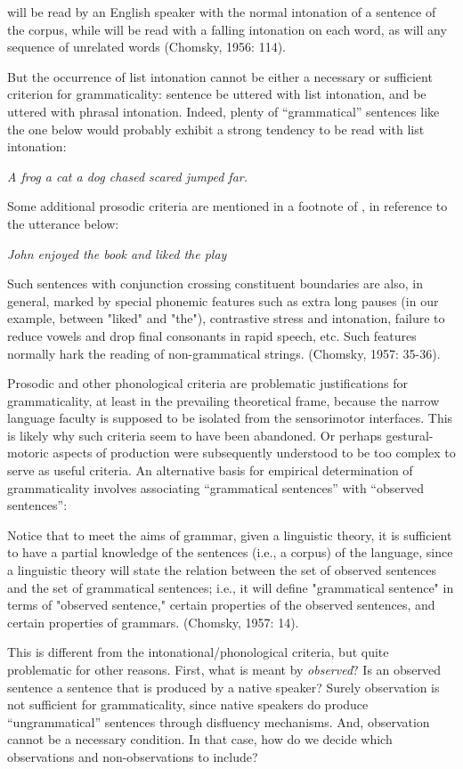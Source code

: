          will be read by an English speaker with the normal intonation of a sentence of the corpus, while  will be read with a falling intonation on each word, as will any sequence of unrelated words (Chomsky, 1956: 114).

  But the occurrence of list intonation cannot be either a necessary or sufficient criterion for grammaticality: sentence  be uttered with list intonation, and  be uttered with phrasal intonation. Indeed, plenty of “grammatical” sentences like the one below would probably exhibit a strong tendency to be read with list intonation: 

\textit{A frog a cat a dog chased scared jumped far.}

Some additional prosodic criteria are mentioned in a footnote of \citet{Chomsky1957}, in reference to the utterance below:

\textit{John enjoyed the book and liked the play}

Such sentences with conjunction crossing constituent boundaries are also, in general, marked by special phonemic features such as extra long pauses (in our example, between "liked" and "the"), contrastive stress and intonation, failure to reduce vowels and drop final consonants in rapid speech, etc. Such features normally hark the reading of non-grammatical strings. (Chomsky, 1957: 35-36).

  Prosodic and other phonological criteria are problematic justifications for grammaticality, at least in the prevailing theoretical frame, because the narrow language faculty is supposed to be isolated from the sensorimotor interfaces. This is likely why such criteria seem to have been abandoned. Or perhaps gestural-motoric aspects of production were subsequently understood to be too complex to serve as useful criteria.   An alternative basis for empirical determination of grammaticality involves associating “grammatical sentences” with “observed sentences”:

Notice that to meet the aims of grammar, given a linguistic theory, it is sufficient to have a partial knowledge of the sentences (i.e., a corpus) of the language, since a linguistic theory will state the relation between the set of observed sentences and the set of grammatical sentences; i.e., it will define "grammatical sentence" in terms of "observed sentence," certain properties of the observed sentences, and certain properties of grammars. (Chomsky, 1957: 14).

  This is different from the intonational/phonological criteria, but quite problematic for other reasons. First, what is meant by \textit{observed}? Is an observed sentence a sentence that is produced by a native speaker? Surely observation is not sufficient for grammaticality, since native speakers do produce “ungrammatical” sentences through disfluency mechanisms. And, observation cannot be a necessary condition. In that case, how do we decide which observations and non-observations to include?

